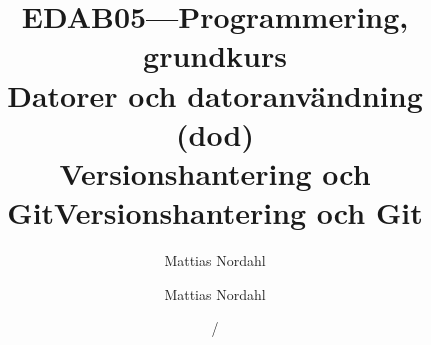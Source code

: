 \documentclass[handout]{beamer}
\author[]{Mattias Nordahl}
\institute{\url{mattias.nordahl@cs.lth.se}}
\date{}
\begin{document}
 

\title{{\small\bf EDAB05---Programmering, grundkurs}\\Datorer och datoranvändning (dod)\\Versionshantering och Git} 

\frame[plain]{
\maketitle

\vspace{-2\baselineskip}
}

\title{Versionshantering och Git}
\institute{}
\author{Mattias Nordahl}
\date{\the\year/\the\numexpr{}} 


\end{document}
